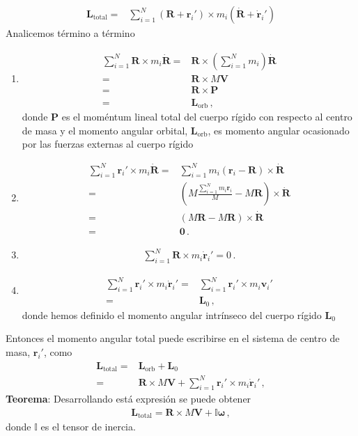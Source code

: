 \begin{align}
   \mathbf{L}_{\text{total}}=&\sum_{i=1}^N
   \left(\mathbf{R}+\mathbf{r}_i'\right)\times m_i
   \left(\dot{\mathbf{R}}+\dot{\mathbf{r}}_i'\right)
\end{align}
Analicemos término a término
\begin{enumerate}
\item 
\begin{align*}
  \sum_{i=1}^N\mathbf{R}\times m_i\dot{\mathbf{R}}=&\mathbf{R}\times
  \left(\sum_{i=1}^N m_i\right)\dot{\mathbf{R}}\nonumber\\
  =&\mathbf{R}\times M\mathbf{V}\nonumber\\
  =&\mathbf{R}\times \mathbf{P}\nonumber\\
  =&\mathbf{L}_{\text{orb}}\,,
\end{align*}
donde $\mathbf{P}$ es el moméntum lineal total del cuerpo rígido con
respecto al centro de masa y el momento angular orbital,
$\mathbf{L}_{\text{orb}}$, es momento angular ocasionado por las
fuerzas externas al cuerpo rígido
\item
  \begin{align}
    \label{eq:rmr}
    \sum_{i=1}^N\mathbf{r}_i'\times m_i \dot{\mathbf{R}}
    =&\sum_{i=1}^N m_i\left(\mathbf{r}_i-\mathbf{R}\right)\times  \dot{\mathbf{R}}\nonumber\\
    =&\left(M\frac{\sum_{i=1}^N m_i\mathbf{r}_i}{M}- M \mathbf{R}\right)\times  \dot{\mathbf{R}}\nonumber\\
    =&\left(M\mathbf{R}- M \mathbf{R}\right)\times  \dot{\mathbf{R}}\nonumber\\
    =&\mathbf{0}\,.
  \end{align}
\item
  \begin{align*}
    \sum_{i=1}^N \mathbf{R}\times m_i \dot{\mathbf{r}}_i'=0\,.
  \end{align*}
\item
  \begin{align*}
    \sum_{i=1}^N \mathbf{r}_i'\times m_i \dot{\mathbf{r}}_i'=&
    \sum_{i=1}^N \mathbf{r}_i'\times m_i \mathbf{v}_i'\nonumber\\
    =&\mathbf{L}_0\,,
  \end{align*}
donde hemos definido el momento angular intrínseco del cuerpo rígido $\mathbf{L}_0$


\end{enumerate}

Entonces el momento angular total puede  escribirse en el sistema de centro de masa, $\mathbf{r}_i'$, como 
\begin{align}
  \label{eq:lcm}
   \mathbf{L}_{\text{total}}=&\mathbf{L}_{\text{orb}}+\mathbf{L}_0\nonumber\\
   =&\mathbf{R}\times M\mathbf{V}+\sum_{i=1}^N \mathbf{r}_i'\times m_i\dot{\mathbf{r}}_i'\,,
\end{align}
\noindent
\textbf{Teorema}: Desarrollando está expresión se puede obtener
\begin{align}
  \label{eq:tensorI}
  \mathbf{L}_{\text{total}}=\mathbf{R}\times M\mathbf{V}+\mathbb{I}\boldsymbol{\omega}\,,
\end{align}
donde $\mathbb{I}$ es el tensor de inercia. 
\medskip


